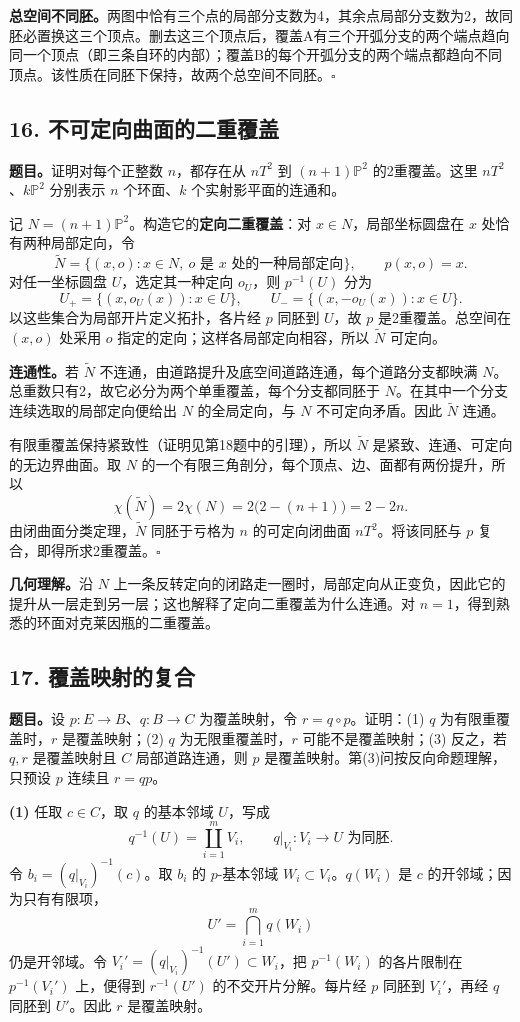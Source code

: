 \documentclass[UTF8,11pt,a4paper]{ctexart}
\newcommand{\problem}[2]{\subsection*{#1}\noindent\textbf{题目。}#2\par}
\begin{document}
\textbf{总空间不同胚。}两图中恰有三个点的局部分支数为4，其余点局部分支数为2，故同胚必置换这三个顶点。删去这三个顶点后，覆盖A有三个开弧分支的两个端点趋向同一个顶点（即三条自环的内部）；覆盖B的每个开弧分支的两个端点都趋向不同顶点。该性质在同胚下保持，故两个总空间不同胚。\hfill$\square$
\newpage
\problem{16. 不可定向曲面的二重覆盖}{证明对每个正整数 $n$，都存在从 $nT^2$ 到 $(n+1)\mathbb P^2$ 的2重覆盖。这里 $nT^2$、$k\mathbb P^2$ 分别表示 $n$ 个环面、$k$ 个实射影平面的连通和。}
\pf 记 $N=(n+1)\mathbb P^2$。构造它的\textbf{定向二重覆盖}：对 $x\in N$，局部坐标圆盘在 $x$ 处恰有两种局部定向，令
\[\widetilde N=\{(x,o):x\in N,\ o\text{ 是 }x\text{ 处的一种局部定向}\},\qquad p(x,o)=x.\]
对任一坐标圆盘 $U$，选定其一种定向 $o_U$，则 $p^{-1}(U)$ 分为
\[U_+=\{(x,o_U(x)):x\in U\},\qquad U_-=\{(x,-o_U(x)):x\in U\}.\]
以这些集合为局部开片定义拓扑，各片经 $p$ 同胚到 $U$，故 $p$ 是2重覆盖。总空间在 $(x,o)$ 处采用 $o$ 指定的定向；这样各局部定向相容，所以 $\widetilde N$ 可定向。

\textbf{连通性。}若 $\widetilde N$ 不连通，由道路提升及底空间道路连通，每个道路分支都映满 $N$。总重数只有2，故它必分为两个单重覆盖，每个分支都同胚于 $N$。在其中一个分支连续选取的局部定向便给出 $N$ 的全局定向，与 $N$ 不可定向矛盾。因此 $\widetilde N$ 连通。

有限重覆盖保持紧致性（证明见第18题中的引理），所以 $\widetilde N$ 是紧致、连通、可定向的无边界曲面。取 $N$ 的一个有限三角剖分，每个顶点、边、面都有两份提升，所以
\[\chi(\widetilde N)=2\chi(N)=2\bigl(2-(n+1)\bigr)=2-2n.\]
由闭曲面分类定理，$\widetilde N$ 同胚于亏格为 $n$ 的可定向闭曲面 $nT^2$。将该同胚与 $p$ 复合，即得所求2重覆盖。\hfill$\square$

\medskip\noindent\textbf{几何理解。}沿 $N$ 上一条反转定向的闭路走一圈时，局部定向从正变负，因此它的提升从一层走到另一层；这也解释了定向二重覆盖为什么连通。对 $n=1$，得到熟悉的环面对克莱因瓶的二重覆盖。
\newpage
\problem{17. 覆盖映射的复合}{设 $p:E\to B$、$q:B\to C$ 为覆盖映射，令 $r=q\circ p$。证明：(1) $q$ 为有限重覆盖时，$r$ 是覆盖映射；(2) $q$ 为无限重覆盖时，$r$ 可能不是覆盖映射；(3) 反之，若 $q,r$ 是覆盖映射且 $C$ 局部道路连通，则 $p$ 是覆盖映射。第(3)问按反向命题理解，只预设 $p$ 连续且 $r=qp$。}
\pf\textbf{(1)} 任取 $c\in C$，取 $q$ 的基本邻域 $U$，写成
\[q^{-1}(U)=\coprod_{i=1}^m V_i,\qquad q|_{V_i}:V_i\to U\text{ 为同胚}.\]
令 $b_i=(q|_{V_i})^{-1}(c)$。取 $b_i$ 的 $p$-基本邻域 $W_i\subset V_i$。$q(W_i)$ 是 $c$ 的开邻域；因为只有有限项，
\[U'=\bigcap_{i=1}^m q(W_i)\]
仍是开邻域。令 $V_i'=(q|_{V_i})^{-1}(U')\subset W_i$，把 $p^{-1}(W_i)$ 的各片限制在 $p^{-1}(V_i')$ 上，便得到 $r^{-1}(U')$ 的不交开片分解。每片经 $p$ 同胚到 $V_i'$，再经 $q$ 同胚到 $U'$。因此 $r$ 是覆盖映射。
\end{document}

